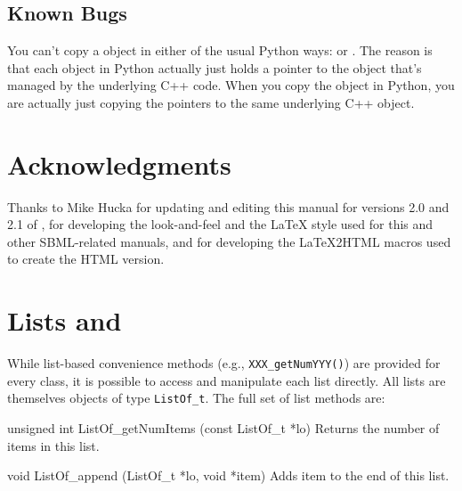 \documentclass{sbmlmanual}
\begin{document}
\subsection{Known Bugs}
\label{sec:python-bugs}

You can't copy a \libsbml{} object in either of the usual Python ways:
 or .  The reason is that each \libsbml{}
object in Python actually just holds a pointer to the \libsbml{} object that's
managed by the underlying C++ code.  When you copy the object in Python, you
are actually just copying the pointers to the same underlying C++ object.


\section{Acknowledgments}
\label{sec:acknowledgments}

Thanks to Mike Hucka for updating and editing this manual for versions 2.0
and 2.1 of \libsbml{}, for developing the look-and-feel and the LaTeX style
used for this and other SBML-related manuals, and for developing the
LaTeX2HTML macros used to create the HTML version.


\clearpage
\appendix
\section{Lists and }
\label{app:lists}

While list-based convenience methods (e.g., \texttt{XXX\_getNumYYY()}) are
provided for every class, it is possible to access and manipulate each list
directly.  All lists are themselves objects of type \texttt{ListOf\_t}.
The full set of list methods are:


\begin{methoddef}{unsigned int ListOf\_getNumItems (const ListOf\_t *lo)}
  Returns the number of items in this list.
\end{methoddef}


\begin{methoddef}{void ListOf\_append (ListOf\_t *lo, void *item)}
  Adds item to the end of this list.
\end{methoddef}
\end{document}
